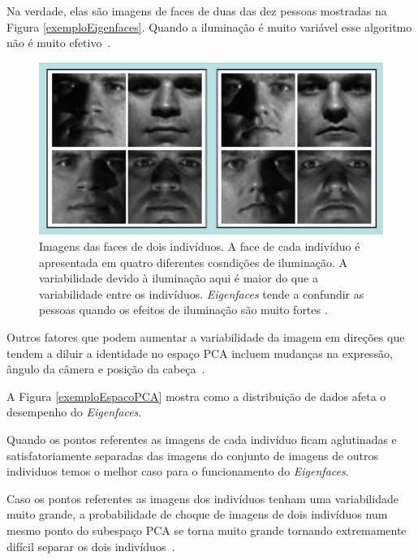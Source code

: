 Na verdade, elas são imagens de faces de duas das dez pessoas mostradas na Figura \ref{exemploEigenfaces}. Quando a iluminação é muito variável esse algoritmo não é muito efetivo~\cite{hewitt}.

	\begin{figure}[hbt]
		\begin{center}
			\includegraphics[width=15cm]{figuras/2.FundamentacaoTeorica/exemplosImagensIluminacaoo.png}
		\end{center}
		\caption{Imagens das faces de dois indivíduos. A face de cada indivíduo é apresentada em quatro diferentes cosndições de iluminação. A variabilidade devido à iluminação aqui é maior do que a variabilidade entre os indivíduos. \textit{Eigenfaces} tende a confundir as pessoas quando os efeitos de iluminação são muito fortes \cite{hewitt}.}
		\label{exemplosImagensIluminacaoo}
	\end{figure}

Outros fatores que podem aumentar a variabilidade da imagem em direções que tendem a diluir a identidade no espaço PCA incluem mudanças na expressão, ângulo da câmera e posição da cabeça~\cite{hewitt}.

A Figura \ref{exemploEspacoPCA} mostra como a distribuição de dados afeta o desempenho do \textit{Eigenfaces}.

Quando os pontos referentes as imagens de cada indivíduo ficam aglutinadas e satisfatoriamente separadas das imagens do conjunto de imagens de outros individuos temos o melhor caso para o funcionamento do \textit{Eigenfaces}.

Caso os pontos referentes as imagens dos indivíduos tenham uma variabilidade muito grande, a probabilidade de choque de imagens de dois indivíduos num mesmo ponto do subespaço PCA se torna muito grande tornando extremamente difícil separar os dois indivíduos~\cite{hewitt}.

